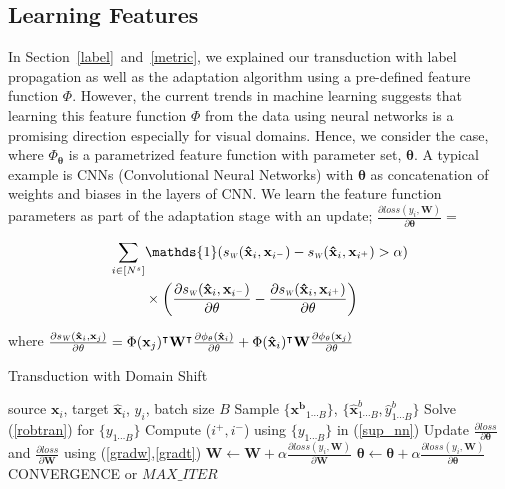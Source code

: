 \subsection{Learning Features}
In Section~\ref{label}~and~\ref{metric}, we explained our transduction with label propagation as well as the adaptation algorithm using a pre-defined feature function $\Phi$. However, the current trends in machine learning suggests that learning this feature function $\Phi$ from the data using neural networks is a promising direction especially for visual domains. Hence, we consider the case, where $\Phi_{\mathbf{\theta}}$ is a parametrized feature function with parameter set, $\mathbf{\theta}$. A typical example is CNNs (Convolutional Neural Networks) with $\mathbf{\theta}$ as concatenation of weights and biases in the layers of CNN. We learn the feature function parameters as part of the adaptation stage with an update; $\frac{\partial loss (y_i, \mathbf{W})}{\partial \mathbf{\theta}} =$

\vspace{-3mm}
\begin{small}
\begin{equation}
\begin{aligned}
 \sum_{i \in [N^s]} &\mathds{1}(\sw(\xsi,\mathbf{x}_{i^-}) - \sw(\xsi,\mathbf{x}_{i^+})>\alpha)  \\
 &\times \left(\frac{\partial \sw(\xsi,\mathbf{x}_{i^-}) }{\partial \mathbf{\theta}} - \frac{\partial \sw(\xsi,\mathbf{x}_{i^+}) }{\partial \mathbf{\theta}} \right)
 \label{gradt}
 \end{aligned}
\end{equation}
\end{small}
where {\small $\frac{\partial \sw(\xsi,\xuj) }{\partial \mathbf{\theta}} =\Phi(\xuj)^\intercal \mathbf{W}^\intercal \frac{\partial \phi_\mathbf{\theta}(\xsi)}{\partial \theta} + \Phi(\xsi)^\intercal \mathbf{W} \frac{\partial \phi_\mathbf{\theta}(\xuj)}{\partial \theta} $}
\vspace{-3mm}

\begin{algorithm}[tb]
   \caption{Transduction with Domain Shift}
   \label{alg:example}
\begin{algorithmic}
    source $\mathbf{x}_i$, target $\mathbf{\hat{x}}_i$, $y_i$, batch size $B$
   \REPEAT
   \STATE  Sample $\{\mathbf{x^b}_{1 \cdots B}\}$, $\{\mathbf{\hat{x}}^b_{1 \cdots B}, \hat{y}^b_{1\cdots B}\}$
   \STATE Solve (\ref{robtran}) for $\{y_{1 \cdots B}\}$
   \STATE Compute ($i^+, i^-$) using $\{y_{1 \cdots B}\}$ in (\ref{sup_nn})
   \STATE Update $\frac{\partial loss}{\partial \mathbf{\theta}}$ and  $\frac{\partial loss}{\partial \mathbf{W}} $ using (\ref{gradw},\ref{gradt})
   \ENDIF
   \ENDFOR
   \STATE $\mathbf{W} \leftarrow \mathbf{W} + \alpha \frac{\partial loss (y_i, \mathbf{W})}{\partial \mathbf{W}}$ 
   \STATE $\mathbf{\theta} \leftarrow \mathbf{\theta} + \alpha \frac{\partial loss (y_i, \mathbf{W})}{\partial \mathbf{\theta}}$
   \UNTIL CONVERGENCE or $MAX\_ITER$
\end{algorithmic}
\end{algorithm}

